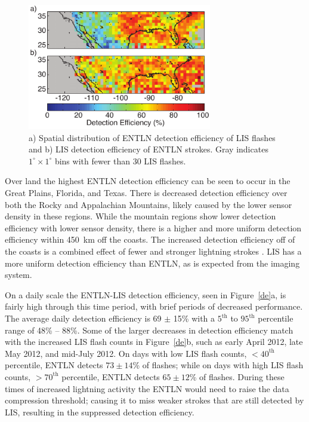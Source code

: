 \begin{figure}[t]
   \centering
   \noindent\includegraphics[width=19pc,angle=0]{entln_lis/Figures/map.pdf}
   \caption{a) Spatial distribution of ENTLN detection efficiency of LIS flashes and
   		b) LIS detection efficiency of ENTLN strokes.
   		Gray indicates $1^\circ \times 1^\circ$ bins with fewer than 30 LIS flashes.
		}
   \label{map}
\end{figure}

Over land the highest ENTLN detection efficiency can be seen to occur in the Great Plains, Florida, and Texas.
There is decreased detection efficiency over both the Rocky and Appalachian Mountains, likely caused by the lower sensor density in these regions.
While the mountain regions show lower detection efficiency with lower sensor density, there is a higher and more uniform detection efficiency within 450~km off the coasts.
The increased detection efficiency off of the coasts is a combined effect of fewer and stronger lightning strokes \citep{Hutchins2013, Rudlosky2010}.
LIS has a more uniform detection efficiency than ENTLN, as is expected from the imaging system.

On a daily scale the ENTLN-LIS detection efficiency, seen in Figure~\ref{de}a, is fairly high through this time period, with brief periods of decreased performance.
The average daily detection efficiency is 69 $\pm$ 15\% with a $5^\text{th}$ to $95^\text{th}$ percentile range of 48\% -- 88\%.
Some of the larger decreases in detection efficiency match with the increased LIS flash counts in Figure~\ref{de}b, such as early April 2012, late May 2012, and mid-July 2012.
On days with low LIS flash counts, $<40^\text{th}$ percentile, ENTLN detects $73\pm14$\% of flashes; while on days with high LIS flash counts, $>70^\text{th}$ percentile, ENTLN detects $65\pm12$\% of flashes.
During these times of increased lightning activity the ENTLN would need to raise the data compression threshold; causing it to miss weaker strokes that are still detected by LIS, resulting in the suppressed detection efficiency.

